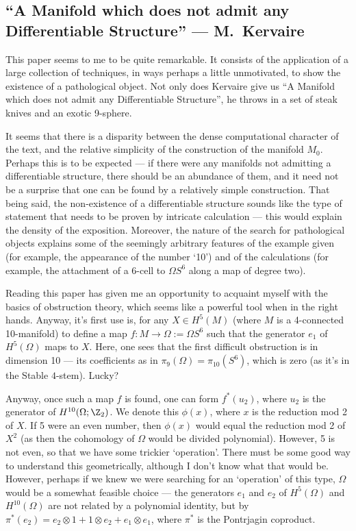 \documentclass[11pt]{article}
\newcommand{\KanSemResponse}[1]
{
\thispagestyle{fancy}
\section{#1}
}
\begin{document}
\begin{Kervaire NoDifferentiableStructure}
\KanSemResponse
{``A Manifold which does not admit any Differentiable Structure'' --- M.\ Kervaire}
This paper seems to me to be quite remarkable. It consists of the application of a large collection of techniques, in ways perhaps a little unmotivated, to show the existence of a pathological object. Not only does Kervaire give us ``A Manifold which does not admit any Differentiable Structure'', he throws in a set of steak knives and an exotic 9-sphere.

It seems that there is a disparity between the dense computational character of the text, and the relative simplicity of the construction of the manifold $M_0$. Perhaps this is to be expected --- if there were any manifolds not admitting a differentiable structure, there should be an abundance of them, and it need not be a surprise that one can be found by a relatively simple construction. That being said, the non-existence of a differentiable structure sounds like the type of statement that needs to be proven by intricate calculation --- this would explain the density of the exposition. Moreover, the nature of the search for pathological objects explains some of the seemingly arbitrary features of the example given (for example, the appearance of the number `10') and of the calculations (for example, the attachment of a 6-cell to $\Omega S^6$ along a map of degree two).

Reading this paper has given me an opportunity to acquaint myself with the basics of obstruction theory, which seems like a powerful tool when in the right hands. Anyway, it's first use is, for any $X\in H^5(M)$ (where $M$ is a 4-connected 10-manifold) to define a map $f:M\to\Omega:=\Omega S^6$ such that the generator $e_1$ of $H^5(\Omega)$ maps to $X$. Here, one sees that the first difficult obstruction is in dimension 10 --- its coefficients as in $\pi_9(\Omega)=\pi_{10}(S^6)$, which is zero (as it's in the Stable $4$-stem). Lucky?

Anyway, once such a map $f$ is found, one can form $f^*(u_2)$, where $u_2$ is the generator of $H^{10}(\Omega;\Z_2)$. We denote this $\phi(x)$, where $x$ is the reduction mod 2 of $X$. If 5 were an even number, then $\phi(x)$ would equal the reduction mod 2 of $X^2$ (as then the cohomology of $\Omega$ would be divided polynomial). However, 5 is not even, so that we have some trickier `operation'. There must be some good way to understand this geometrically, although I don't know what that would be. However, perhaps if we knew we were searching for an `operation' of this type, $\Omega$ would be a somewhat feasible choice --- the generators $e_1$ and $e_2$ of $H^5(\Omega)$ and $H^{10}(\Omega)$ are not related by a polynomial identity, but by $\pi^*(e_2)=e_2\otimes1+1\otimes e_2+e_1\otimes e_1$, where $\pi^*$ is the Pontrjagin coproduct.


\end{Kervaire NoDifferentiableStructure}
\end{document}
